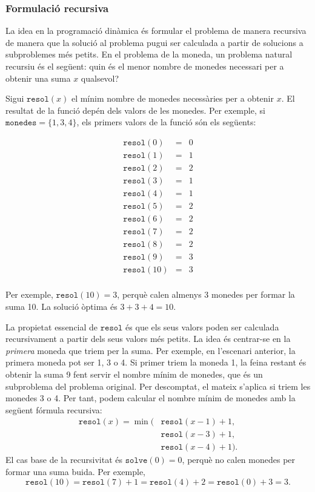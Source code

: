\subsubsection{Formulació recursiva}

La idea en la programació dinàmica és
formular el problema de manera recursiva
de manera que la solució al problema pugui ser
calculada a partir de solucions a subproblemes més petits.
En el problema de la moneda, un problema natural
recursiu és el següent:
quin és el menor nombre de monedes
necessari per a obtenir una suma $x$ qualsevol?

Sigui $\texttt{resol}(x)$
el mínim nombre de monedes necessàries per a obtenir $x$.
El resultat de la funció depén dels
valors de les monedes.
Per exemple, si $\texttt{monedes} = \{1,3,4\}$,
els primers valors de la funció són els següents:

\[
\begin{array}{lcl}
\texttt{resol}(0) & = & 0 \\
\texttt{resol}(1) & = & 1 \\
\texttt{resol}(2) & = & 2 \\
\texttt{resol}(3) & = & 1 \\
\texttt{resol}(4) & = & 1 \\
\texttt{resol}(5) & = & 2 \\
\texttt{resol}(6) & = & 2 \\
\texttt{resol}(7) & = & 2 \\
\texttt{resol}(8) & = & 2 \\
\texttt{resol}(9) & = & 3 \\
\texttt{resol}(10) & = & 3 \\
\end{array}
\]

Per exemple, $\texttt{resol}(10)=3$,
perquè calen almenys 3 monedes
per formar la suma 10.
La solució òptima és $3+3+4=10$.

La propietat essencial de $\texttt{resol}$ és
que els seus valors poden ser
calculada recursivament a partir dels seus valors més petits.
La idea és centrar-se en la \emph{primera}
moneda que triem per la suma.
Per exemple, en l'escenari anterior,
la primera moneda pot ser 1, 3 o 4.
Si primer triem la moneda 1,
la feina restant és obtenir la suma 9
fent servir el nombre mínim de monedes,
que és un subproblema del problema original.
Per descomptat, el mateix s'aplica si triem les monedes 3 o 4.
Per tant, podem calcular el nombre mínim de monedes
amb la següent fórmula recursiva:
\begin{equation*}
\begin{split}
\texttt{resol}(x) = \min( & \texttt{resol}(x-1)+1, \\
                           & \texttt{resol}(x-3)+1, \\
                           & \texttt{resol}(x-4)+1).
\end{split}
\end{equation*}
El cas base de la recursivitat és $\texttt{solve}(0)=0$,
perquè no calen monedes per formar una suma buida.
Per exemple,
\[ \texttt{resol}(10) = \texttt{resol}(7)+1 = \texttt{resol}(4)+2 = \texttt{resol}(0)+3 = 3.\]

